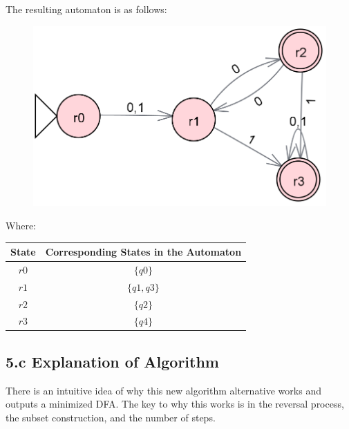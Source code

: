 \documentclass[12pt]{article}
\begin{document}
\bigskip\bigskip\bigskip\bigskip\bigskip\bigskip\bigskip\bigskip\bigskip\bigskip\bigskip\bigskip\bigskip\bigskip\bigskip

The resulting automaton is as follows:

\begin{figure}[h]
    \centering
    \includegraphics[width=0.5\linewidth]{Second_Automaton_Fourth_Step.png}
\end{figure}

Where:

\begin{center}
\begin{tabular}{|c|c|}
    \hline
    State & Corresponding States in the Automaton \\
    \hline
    $r0$ & $\{q0\}$ \\
    $r1$ & $\{q1, q3\}$ \\
    $r2$ & $\{q2\}$ \\
    $r3$ & $\{q4\}$ \\
    \hline
\end{tabular}
\end{center}


\subsection*{5.c Explanation of Algorithm}

There is an intuitive idea of why this new algorithm alternative works and outputs a minimized DFA. The key to why this works is in the reversal process, the subset construction, and the number of steps.
\end{document}
